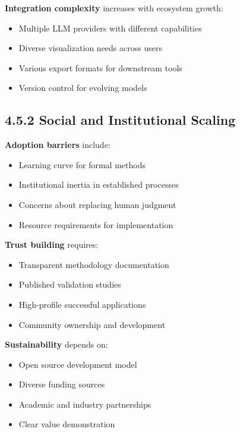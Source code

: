 \documentclass[
  11pt,
  letterpaper,
]{book}
\providecommand{\tightlist}{%
  \setlength{\itemsep}{0pt}\setlength{\parskip}{0pt}}
\begin{document}
\textbf{Integration complexity} increases with ecosystem growth:

\begin{itemize}
\tightlist
\item
  Multiple LLM providers with different capabilities
\item
  Diverse visualization needs across users
\item
  Various export formats for downstream tools
\item
  Version control for evolving models
\end{itemize}

\subsection{4.5.2 Social and Institutional
Scaling}\label{sec-social-scaling}

\textbf{Adoption barriers} include:

\begin{itemize}
\tightlist
\item
  Learning curve for formal methods
\item
  Institutional inertia in established processes
\item
  Concerns about replacing human judgment
\item
  Resource requirements for implementation
\end{itemize}

\textbf{Trust building} requires:

\begin{itemize}
\tightlist
\item
  Transparent methodology documentation
\item
  Published validation studies
\item
  High-profile successful applications
\item
  Community ownership and development
\end{itemize}

\textbf{Sustainability} depends on:

\begin{itemize}
\tightlist
\item
  Open source development model
\item
  Diverse funding sources
\item
  Academic and industry partnerships
\item
  Clear value demonstration
\end{itemize}
\end{document}
